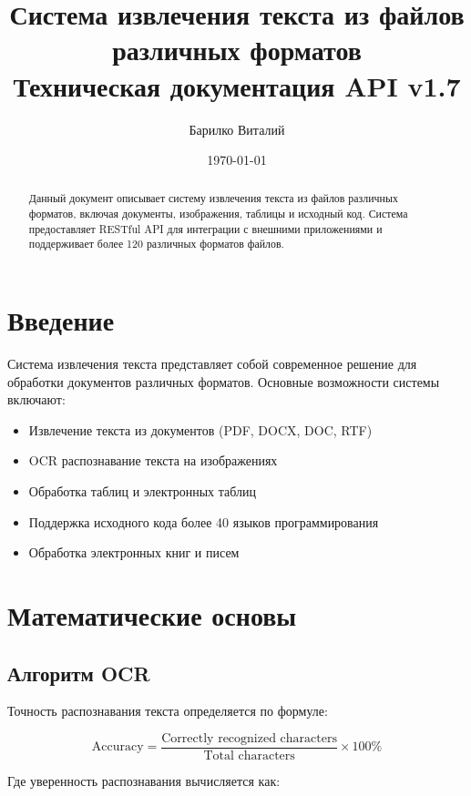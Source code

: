 \documentclass[12pt,a4paper]{article}
\title{\textbf{Система извлечения текста из файлов различных форматов} \\
       \large Техническая документация API v1.7}
\author{Барилко Виталий}
\date{\today}
\begin{document}
\maketitle

\begin{abstract}
Данный документ описывает систему извлечения текста из файлов различных форматов, включая документы, изображения, таблицы и исходный код. Система предоставляет RESTful API для интеграции с внешними приложениями и поддерживает более 120 различных форматов файлов.
\end{abstract}

\tableofcontents
\newpage

\section{Введение}

Система извлечения текста представляет собой современное решение для обработки документов различных форматов. Основные возможности системы включают:

\begin{itemize}
    \item Извлечение текста из документов (PDF, DOCX, DOC, RTF)
    \item OCR распознавание текста на изображениях
    \item Обработка таблиц и электронных таблиц
    \item Поддержка исходного кода более 40 языков программирования
    \item Обработка электронных книг и писем
\end{itemize}

\section{Математические основы}

\subsection{Алгоритм OCR}

Точность распознавания текста определяется по формуле:

\begin{equation}
\text{Accuracy} = \frac{\text{Correctly recognized characters}}{\text{Total characters}} \times 100\%
\end{equation}

Где уверенность распознавания вычисляется как:
\end{document}
